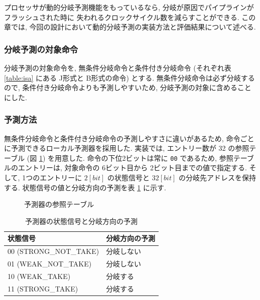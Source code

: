 \documentclass[../improvements.tex]{subflies}
\begin{document}
  プロセッサが動的分岐予測機能をもっているなら, 分岐が原因でパイプラインがフラッシュされた時に
  失われるクロックサイクル数を減らすことができる.
  この章では, 今回の設計において動的分岐予測の実装方法と評価結果について述べる.

  \subsubsection{分岐予測の対象命令}
  分岐予測の対象命令を, 無条件分岐命令と条件付き分岐命令 
  (それぞれ表 \ref{table:isa} にある J形式と B形式の命令) とする.
  無条件分岐命令は必ず分岐するので, 条件付き分岐命令よりも予測しやすいため, 
  分岐予測の対象に含めることにした.

  \subsubsection{予測方法}
  無条件分岐命令と条件付き分岐命令の予測しやすさに違いがあるため, 
  命令ごとに予測できるローカル予測器を採用した.
  実装では, エントリー数が 32 の参照テーブル (図 \ref{fig:predictor-table}) を用意した.
  命令の下位2ビットは常に \verb|00| であるため, 
  参照テーブルのエントリーは, 対象命令の 6ビット目から 2ビット目までの値で指定する.
  そして, 1つのエントリーに $2[bit]$ の状態信号と $32[bit]$ の分岐先アドレスを保持する.
  状態信号の値と分岐方向の予測を表 \ref{table:predictor-state} に示す.
  
  \begin{figure}
    \caption{予測器の参照テーブル}
    \label{fig:predictor-table}
  \end{figure}

  \begin{table}[h!]
    \centering
    \begin{tabular}{|l|l|}
    \hline
    状態信号 & 分岐方向の予測 \\ \hline
    00 (STRONG\_NOT\_TAKE) & 分岐しない \\
    01 (WEAK\_NOT\_TAKE) & 分岐しない \\
    10 (WEAK\_TAKE) & 分岐する \\
    11 (STRONG\_TAKE) & 分岐する \\ \hline
    \end{tabular}
    \caption{予測器の状態信号と分岐方向の予測}
    \label{table:predictor-state}
  \end{table}
\end{document}
